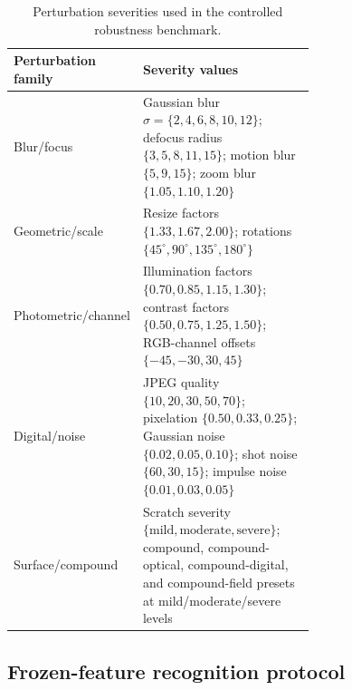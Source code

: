 \documentclass[a4paper,fleqn]{els-cas-templates/cas-sc}
\begin{document}
\begin{table}[pos=htbp]
\centering
\caption{Perturbation severities used in the controlled robustness benchmark.}
\label{tab:severity}
\small
\begin{tabular}{lp{0.66\linewidth}}
\toprule
Perturbation family & Severity values \\
\midrule
Blur/focus & Gaussian blur $\sigma=\{2,4,6,8,10,12\}$; defocus radius $\{3,5,8,11,15\}$; motion blur $\{5,9,15\}$; zoom blur $\{1.05,1.10,1.20\}$ \\
Geometric/scale & Resize factors $\{1.33,1.67,2.00\}$; rotations $\{45^\circ,90^\circ,135^\circ,180^\circ\}$ \\
Photometric/channel & Illumination factors $\{0.70,0.85,1.15,1.30\}$; contrast factors $\{0.50,0.75,1.25,1.50\}$; RGB-channel offsets $\{-45,-30,30,45\}$ \\
Digital/noise & JPEG quality $\{10,20,30,50,70\}$; pixelation $\{0.50,0.33,0.25\}$; Gaussian noise $\{0.02,0.05,0.10\}$; shot noise $\{60,30,15\}$; impulse noise $\{0.01,0.03,0.05\}$ \\
Surface/compound & Scratch severity $\{\text{mild},\text{moderate},\text{severe}\}$; compound, compound-optical, compound-digital, and compound-field presets at mild/moderate/severe levels \\
\bottomrule
\end{tabular}
\end{table}

\subsection{Frozen-feature recognition protocol}
\label{sec:protocol}
\end{document}
